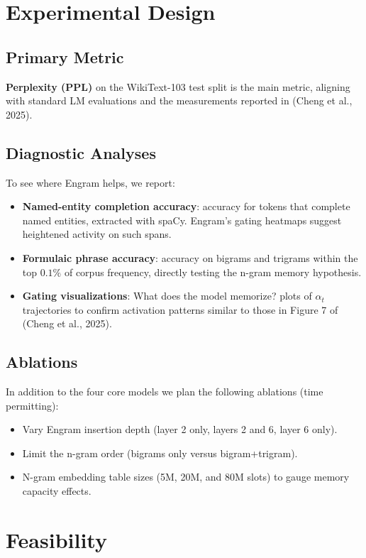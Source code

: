 \documentclass[11pt]{article}
\begin{document}
\section{Experimental Design}
\subsection{Primary Metric}
\textbf{Perplexity (PPL)} on the WikiText-103 test split is the main metric, aligning with standard LM evaluations and the measurements reported in (Cheng et al., 2025).

\subsection{Diagnostic Analyses}
To see where Engram helps, we report:
\begin{itemize}
    \item \textbf{Named-entity completion accuracy}: accuracy for tokens that complete named entities, extracted with spaCy. Engram's gating heatmaps suggest heightened activity on such spans.
    \item \textbf{Formulaic phrase accuracy}: accuracy on bigrams and trigrams within the top $0.1\%$ of corpus frequency, directly testing the n-gram memory hypothesis.
    \item \textbf{Gating visualizations}: What does the model memorize? plots of $\alpha_t$ trajectories to confirm activation patterns similar to those in Figure 7 of (Cheng et al., 2025).
\end{itemize}

\subsection{Ablations}
In addition to the four core models we plan the following ablations (time permitting):
\begin{itemize}
    \item Vary Engram insertion depth (layer 2 only, layers 2 and 6, layer 6 only).
    \item Limit the n-gram order (bigrams only versus bigram+trigram).
    \item N-gram embedding table sizes (5M, 20M, and 80M slots) to gauge memory capacity effects.
\end{itemize}

\section{Feasibility}
\end{document}
